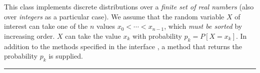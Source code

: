 
This class implements discrete distributions over a \emph{finite set of real numbers}
(also over \emph{integers} as a particular case).
%
We assume that the random variable $X$ of interest can take one of the
$n$ values $x_0 < \cdots < x_{n-1}$, which  \emph{must be sorted} by
increasing order.
$X$ can take the value $x_k$ with probability $p_k = P[X = x_k]$.
In addition to the methods specified in the interface
,
a method that returns the probability $p_k$ is supplied.



\bigskip\hrule

